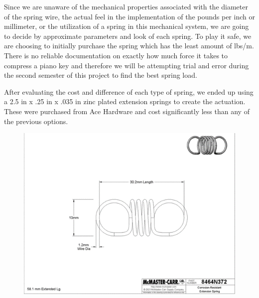 Since we are unaware of the mechanical properties associated with the diameter of the spring wire, the actual feel in the implementation of the pounds per inch or millimeter, or the utilization of a spring in this mechanical system, we are going to decide by approximate parameters and look of each spring. To play it safe, we are choosing to initially purchase the spring which has the least amount of lbs/m. There is no reliable documentation on exactly how much force it takes to compress a piano key and therefore we will be attempting trial and error during the second semester of this project to find the best spring load.

After evaluating the cost and difference of each type of spring, we ended up using a 2.5 in x .25 in x .035 in zinc plated extension springs to create the actuation. These were purchased from Ace Hardware and cost significantly less than any of the previous options.

\newpage
\begin{figure}[h!]
  \centering
  \includegraphics[width=\linewidth]{image/Spring1.png}
  \caption{}
  \label{fig:spring1}
\end{figure}

